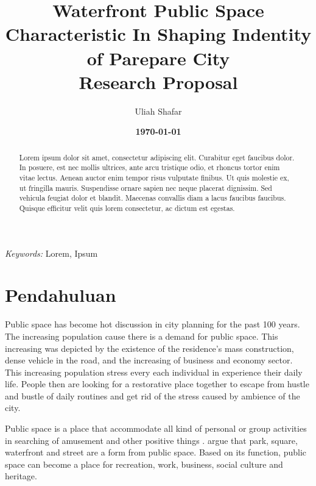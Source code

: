 \documentclass[11pt]{simart} %
\title{
\textbf{Waterfront Public Space Characteristic In Shaping Indentity of Parepare City} \\
\textbf{{Research Proposal \\}}
} %
\date{\textbf{\today}}
\author{Uliah Shafar}
\begin{document}
\maketitle %

\begin{abstract}
Lorem ipsum dolor sit amet, consectetur adipiscing elit. Curabitur eget faucibus dolor. In posuere, est nec mollis ultrices, ante arcu tristique odio, et rhoncus tortor enim vitae lectus. Aenean auctor enim tempor risus vulputate finibus. Ut quis molestie ex, ut fringilla mauris. Suspendisse ornare sapien nec neque placerat dignissim. Sed vehicula feugiat dolor et blandit. Maecenas convallis diam a lacus faucibus faucibus. Quisque efficitur velit quis lorem consectetur, ac dictum est egestas.

\end{abstract}

\hspace*{3.6mm}\textit{Keywords:} Lorem, Ipsum %

\vspace{30pt} %

\section{Pendahuluan}

Public space has become hot discussion in city planning for the past 100 years. The increasing population cause there is a demand for public space. This increasing was depicted by the existence of the  residence's mass construction, dense vehicle in the road, and the increasing of business and economy sector. This increasing population stress every each individual in experience their daily life.
People then are looking for a restorative place together to escape from hustle and bustle of daily routines and get rid of the stress caused by ambience of the city.

Public space is a place that accommodate all kind of personal or group activities in searching of amusement and other positive things \citep{sadat2012}. \cite{sadat2012} argue that park, square, waterfront and street are a form from public space. Based on its function, public space can become a place for recreation, work, business, social culture and heritage.
\end{document}

